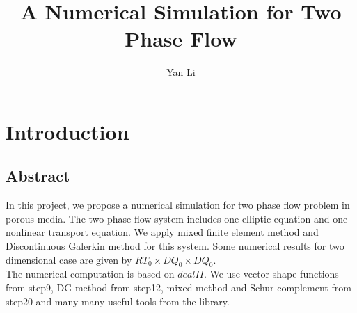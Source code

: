 \documentclass[12pt]{article}
\begin{document}
\author{Yan Li}
\title{A Numerical Simulation for Two Phase Flow}
\maketitle
\section{Introduction}
\subsection{Abstract}

In this project, we propose a numerical simulation for two phase
flow problem in porous media. The two phase flow system includes one
elliptic equation and one nonlinear transport equation. We apply
mixed finite element method and Discontinuous Galerkin method for
this system. Some numerical results for two dimensional case are
given by $RT_{0}\times DQ_{0}\times DQ_{0}$.
\\
The numerical computation is based on $dealII$. We use vector shape
functions from step9, DG method from step12, mixed method and Schur
complement from step20 and many many useful tools from the library.
\end{document}
